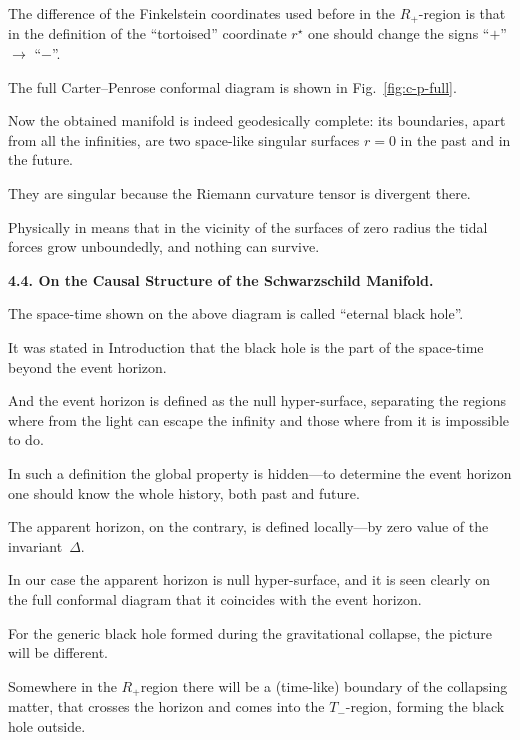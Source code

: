 The difference of the Finkelstein coordinates used before in the $R_+$-region is that in the definition of the ``tortoised'' coordinate $r^{\star}$ one should change the signs ``$+$'' $\to$ ``$-$''. 

The full Carter--Penrose conformal diagram is shown in Fig.~\ref{fig:c-p-full}.

Now the obtained manifold is indeed geodesically complete: its boundaries, apart from all the infinities, are two space-like singular surfaces $r = 0$ in the past and in the future. 

They are singular because the Riemann curvature tensor is divergent there. 

Physically in means that in the vicinity of the surfaces of zero radius the tidal forces grow unboundedly, and nothing can survive. 







\smallskip



\textbf{4.4. On the Causal Structure of the Schwarzschild Manifold.}

The space-time shown on the above diagram is called ``eternal black hole''. 

It was stated in Introduction that the black hole is the part of the space-time beyond the event horizon. 

And the event horizon is defined as the null hyper-surface, separating the regions where from the light can escape the infinity and those where from it is impossible to do. 

In such a definition the global property is hidden---to determine the event horizon one should know the whole history, both past and future. 

The apparent horizon, on the contrary, is defined locally---by zero value of the invariant~$\Delta$.

In our case the apparent horizon is null hyper-surface, and it is seen clearly on the full conformal diagram that it coincides with the event horizon.



For the generic black hole formed during the gravitational collapse, the picture will be different. 

Somewhere in the $R_+$region there will be a (time-like) boundary of the collapsing matter, that crosses the horizon and comes into the $T_-$-region, forming the black hole outside. 

